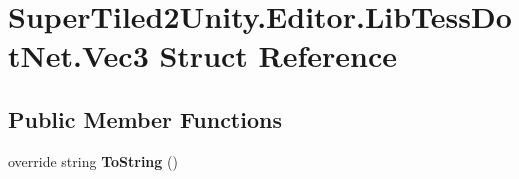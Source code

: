 \hypertarget{struct_super_tiled2_unity_1_1_editor_1_1_lib_tess_dot_net_1_1_vec3}{}\section{Super\+Tiled2\+Unity.\+Editor.\+Lib\+Tess\+Dot\+Net.\+Vec3 Struct Reference}
\label{struct_super_tiled2_unity_1_1_editor_1_1_lib_tess_dot_net_1_1_vec3}
\subsection*{Public Member Functions}
\begin{DoxyCompactItemize}
\item 
\mbox{\label{struct_super_tiled2_unity_1_1_editor_1_1_lib_tess_dot_net_1_1_vec3_ae8241144c328520d38b30a897687718e}} 
override string {\bfseries To\+String} ()
\end{DoxyCompactItemize}

